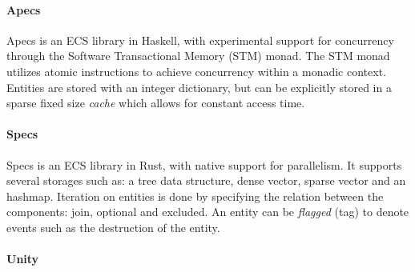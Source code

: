 \documentclass{article}
\begin{document}
\paragraph{Apecs}

Apecs\cite{ecs-apecs} is an ECS library in Haskell, with experimental support for concurrency through the Software Transactional Memory (STM) monad\cite{STM-monad}.
The STM monad utilizes atomic instructions to achieve concurrency within a monadic context.
Entities are stored with an integer dictionary, but can be explicitly stored in a sparse fixed size {\it cache} which allows for constant access time. 

\paragraph{Specs}

Specs is an ECS library in Rust\cite{ecs-specs}, with native support for parallelism.
It supports several storages such as: a tree data structure, dense vector, sparse vector and an hashmap.
Iteration on entities is done by specifying the relation between the components: join, optional and excluded.
An entity can be {\it flagged} (tag) to denote events such as the destruction of the entity.

\paragraph{Unity}
\end{document}
